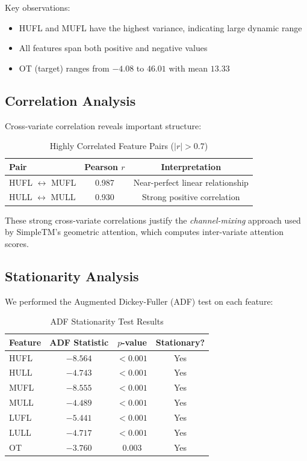 \documentclass[12pt,a4paper]{article}
\begin{document}
Key observations:
\begin{itemize}[noitemsep]
  \item HUFL and MUFL have the highest variance, indicating large dynamic range
  \item All features span both positive and negative values
  \item OT (target) ranges from $-4.08$ to $46.01$ with mean $13.33$
\end{itemize}

\subsection{Correlation Analysis}

Cross-variate correlation reveals important structure:

\begin{table}[H]
\centering
\caption{Highly Correlated Feature Pairs ($|r| > 0.7$)}
\label{tab:corr}
\begin{tabular}{lcc}
\toprule
\textbf{Pair} & \textbf{Pearson $r$} & \textbf{Interpretation} \\
\midrule
HUFL $\leftrightarrow$ MUFL & 0.987 & Near-perfect linear relationship \\
HULL $\leftrightarrow$ MULL & 0.930 & Strong positive correlation \\
\bottomrule
\end{tabular}
\end{table}

These strong cross-variate correlations justify the \textit{channel-mixing} approach used by SimpleTM's geometric attention, which computes inter-variate attention scores.

\subsection{Stationarity Analysis}

We performed the Augmented Dickey-Fuller (ADF) test on each feature:

\begin{table}[H]
\centering
\caption{ADF Stationarity Test Results}
\label{tab:adf}
\begin{tabular}{lccc}
\toprule
\textbf{Feature} & \textbf{ADF Statistic} & \textbf{$p$-value} & \textbf{Stationary?} \\
\midrule
HUFL & $-8.564$ & $< 0.001$ & Yes \\
HULL & $-4.743$ & $< 0.001$ & Yes \\
MUFL & $-8.555$ & $< 0.001$ & Yes \\
MULL & $-4.489$ & $< 0.001$ & Yes \\
LUFL & $-5.441$ & $< 0.001$ & Yes \\
LULL & $-4.717$ & $< 0.001$ & Yes \\
OT   & $-3.760$ & $0.003$   & Yes \\
\bottomrule
\end{tabular}
\end{table}
\end{document}
